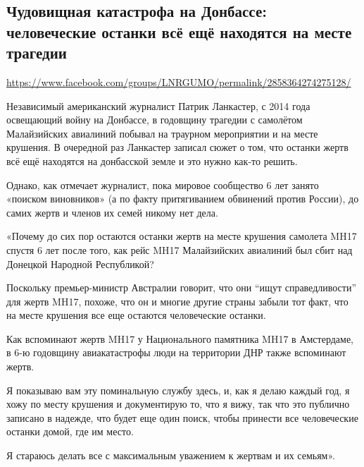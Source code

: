  
 
  
\subsection{Чудовищная катастрофа на Донбассе: человеческие останки всё ещё находятся на месте трагедии}
\label{sec:19_07_2020.fb.lnr.12}
\url{https://www.facebook.com/groups/LNRGUMO/permalink/2858364274275128/}

Независимый американский журналист Патрик Ланкастер, с 2014 года освещающий
войну на Донбассе, в годовщину трагедии с самолётом Малайзийских авиалиний
побывал на траурном мероприятии и на месте крушения. В очередной раз Ланкастер
записал сюжет о том, что останки жертв всё ещё находятся на донбасской земле и
это нужно как-то решить.

Однако, как отмечает журналист, пока мировое сообщество 6 лет занято «поиском
виновников» (а по факту притягиванием обвинений против России), до самих жертв
и членов их семей никому нет дела.

«Почему до сих пор остаются останки жертв на месте крушения самолета MH17
спустя 6 лет после того, как рейс MH17 Малайзийских авиалиний был сбит над
Донецкой Народной Республикой?

Поскольку премьер-министр Австралии говорит, что они ``ищут справедливости'' для
жертв MH17, похоже, что он и многие другие страны забыли тот факт, что на месте
крушения все еще остаются человеческие останки.

Как вспоминают жертв MH17 у Национального памятника MH17 в Амстердаме, в 6-ю
годовщину авиакатастрофы люди на территории ДНР также вспоминают жертв.

Я показываю вам эту поминальную службу здесь, и, как я делаю каждый год, я хожу
по месту крушения и документирую то, что я вижу, так что это публично записано
в надежде, что будет еще один поиск, чтобы принести все человеческие останки
домой, где им место.

Я стараюсь делать все с максимальным уважением к жертвам и их семьям».
  
